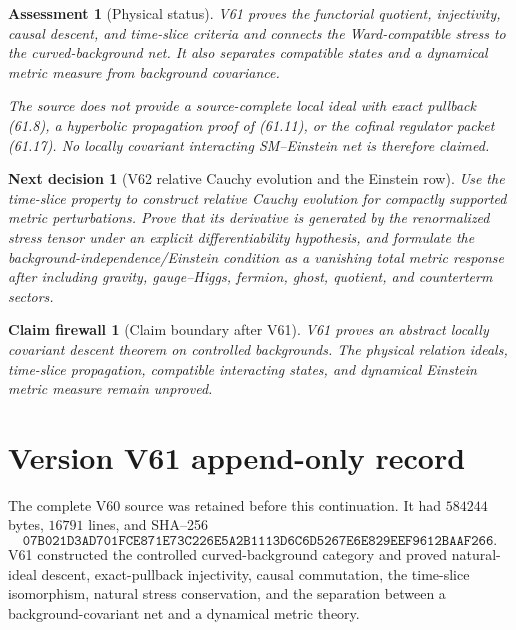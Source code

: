\documentclass[11pt]{article}
\newtheorem{firewall}[theorem]{Claim firewall}
\newtheorem{decision}[theorem]{Next decision}
\newtheorem{assessment}[theorem]{Assessment}
\theoremstyle{remark}
\begin{document}
\begin{assessment}[Physical status]
\label{ass:v15v61-status}
V61 proves the functorial quotient, injectivity, causal descent, and
time-slice criteria and connects the Ward-compatible stress to the
curved-background net.  It also separates compatible states and a
dynamical metric measure from background covariance.

The source does not provide a source-complete local ideal with exact
pullback (61.8), a hyperbolic propagation proof of (61.11), or the
cofinal regulator packet (61.17).  No locally covariant interacting
SM--Einstein net is therefore claimed.
\end{assessment}

\begin{decision}[V62 relative Cauchy evolution and the Einstein row]
\label{dec:v15v61-next}
Use the time-slice property to construct relative Cauchy evolution
for compactly supported metric perturbations.  Prove that its
derivative is generated by the renormalized stress tensor under an
explicit differentiability hypothesis, and formulate the
background-independence/Einstein condition as a vanishing total
metric response after including gravity, gauge--Higgs, fermion,
ghost, quotient, and counterterm sectors.
\end{decision}

\begin{firewall}[Claim boundary after V61]
\label{fire:v15v61}
V61 proves an abstract locally covariant descent theorem on
controlled backgrounds.  The physical relation ideals, time-slice
propagation, compatible interacting states, and dynamical Einstein
metric measure remain unproved.
\end{firewall}

\section*{Version V61 append-only record}
The complete V60 source was retained before this continuation.  It
had \(584244\) bytes, \(16791\) lines, and SHA--256
\[
 \texttt{07B021D3AD701FCE871E73C226E5A2B1113D6C6D5267E6E829EEF9612BAAF266}.
\]
V61 constructed the controlled curved-background category and
proved natural-ideal descent, exact-pullback injectivity, causal
commutation, the time-slice isomorphism, natural stress
conservation, and the separation between a background-covariant net
and a dynamical metric theory.
\end{document}
